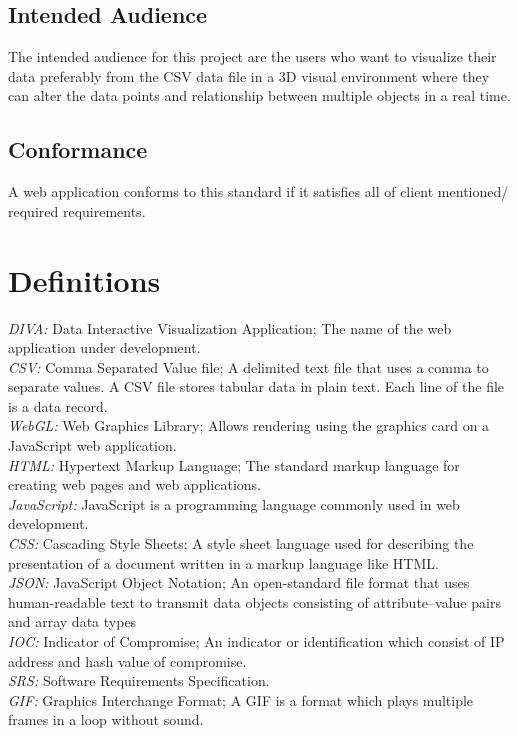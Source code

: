 \documentclass[journal,10pt,onecolumn,compsoc]{IEEEtran} \usepackage[margin=1.0in]{geometry} \usepackage{pdfpages}
\begin{document}
    \subsection{Intended Audience}
    The intended audience for this project are the users who want to visualize their data preferably from the CSV data file in a 3D visual environment where they can alter the data points and relationship between multiple objects in a real time. 
    \subsection{Conformance}
    A web application conforms to this standard if it satisfies all of client mentioned/ required requirements.

\section{Definitions}
    \textit{DIVA: } Data Interactive Visualization Application; The name of the web application under development. \\
    \textit{CSV: } Comma Separated Value file; A delimited text file that uses a comma to separate values. A CSV file stores tabular data in plain text. Each line of the file is a data record. \\
    \textit{WebGL:} Web Graphics Library; Allows rendering using the graphics card on a JavaScript web application.\\
    \textit{HTML:} Hypertext Markup Language; The standard markup language for creating web pages and web applications. \\
    \textit {JavaScript: }JavaScript is a programming language commonly used in web development. \\
    \textit{CSS: }Cascading Style Sheets; A style sheet language used for describing the presentation of a document written in a markup language like HTML. \\
    \textit{JSON: }JavaScript Object Notation; An open-standard file format that uses human-readable text to transmit data objects consisting of attribute–value pairs and array data types\\
    \textit{IOC: }Indicator of Compromise; An indicator or identification which consist of IP address and hash value of compromise.\\
    \textit{SRS: }Software Requirements Specification.\\
    \textit{GIF: }Graphics Interchange Format; A GIF is a format which plays multiple frames in a loop without sound.\\
\end{document}
